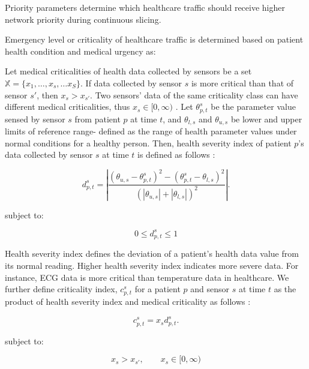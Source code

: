 \documentclass[10pt,journal,compsoc]{IEEEtran}
\begin{document}
Priority parameters determine which healthcare traffic should receive higher network priority during continuous slicing.

Emergency level or criticality of healthcare traffic is determined based on patient health condition and medical urgency as:


Let medical criticalities of health data collected by sensors be a set $\mathbb{X} = \{x_1,\dots, x_{s}, \dots x_S\}$. If data collected by sensor $s$ is more critical than that of sensor $s'$, then $x_{s} > x_{s'}$. Two sensors' data of the same criticality class can have different medical criticalities, thus $x_s \in [0,\infty)$ \cite{basu2022softhealth}. Let $\theta_{p,t}^s$ be the parameter value sensed by sensor $s$ from patient $p$ at time $t$, and $\theta_{l,s}$ and $\theta_{u,s}$ be lower and upper limits of reference range- defined as the range of health parameter values under normal conditions for a healthy person. Then, health severity index of patient $p$'s data collected by sensor $s$ at time $t$ is defined as follows \cite{basu2022softhealth}:

\begin{equation}\label{deviation}
   d_{p,t}^s = \left|\frac{(\theta_{u,s}-\theta_{p,t}^s)^2 - (\theta_{p,t}^s-\theta_{l,s})^2}{(|\theta_{u,s}| + |\theta_{l,s}|)^2} \right|.
\end{equation}

subject to:

\begin{equation}
0 \leq d_{p,t}^{s}\leq 1
\end{equation}

Health severity index defines the deviation of a patient's health data value from its normal reading. Higher health severity index indicates more severe data. For instance, ECG data is more critical than temperature data in healthcare. We further define criticality index, $c_{p,t}^s$ for a patient $p$ and sensor $s$ at time $t$ as the product of health severity index and medical criticality as follows \cite{basu2022softhealth}:

\begin{equation} \label{OverallCriticality}
  c_{p,t}^s = x_{s}d_{p,t}^s.  
\end{equation}

subject to:

\begin{equation}
x_s>x_{s'}, \qquad x_s\in[0,\infty)
\end{equation}
\end{document}
